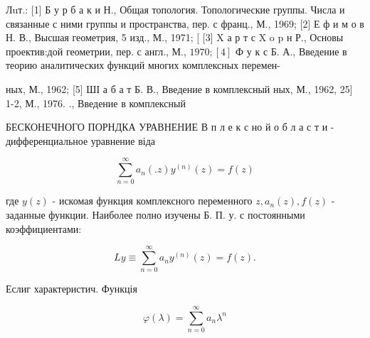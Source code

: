 \documentclass[10pt]{article}
\begin{document}
Лuт.: [1] Б у р б а к и Н., Общая топология. Топологические группы. Числа и связанные с ними группы и пространства, пер. с франц., М., 1969; [2] Е ф и м о в Н. В., Высшая геометрия, 5 изд., М., 1971; [ [3] X а р т с X o p н Р., Основы проектив:дой геометрии, пер. с англ., М., $1970 ;[4]$ Ф у к с Б. А., Введение в теорию аналитических функций многих комплексных перемен-

ных, М., 1962; [5] ШІ а б а т Б. В., Введение в комплексный ных, М., 1962, 25] 1-2, М., 1976. ., Введение в комплексный



БЕСКОНЕЧНОГО ПОРНДКА УРАВНЕНИЕ В п л е к с но й о б л а с т и - дифференциальное уравнение віда



\[

\sum_{n=0}^{\infty} a_{n}(. z) y^{(n)}(z)=f(z)

\]



где $y(z)$ - искомая функция комплексного переменного $z, a_{n}(z), f(z)$ - заданные функции. Наиболее полно изучены Б. П. у. с постоянными коэффициентами:



\[

L y \equiv \sum_{n=0}^{\infty} a_{n} y^{(n)}(z)=f(z) .

\]



Еслиг характеристич. Функція



\[

\varphi(\lambda)=\sum_{n=0}^{\infty} a_{n} \lambda^{n}

\]
\end{document}
